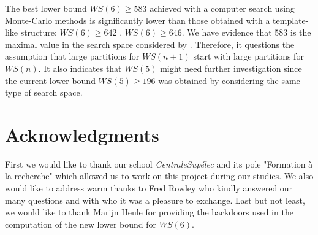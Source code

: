 \documentclass[3p]{elsarticle}
\newtheorem{computational theorem}[definition]{Computational Theorem}
\newcommand{\WS}{\mathit{WS}}
\begin{document}
The best lower bound \(\WS(6) \geqslant 583\) achieved with a computer search using Monte-Carlo methods 
\cite{EliahouBook} is significantly lower than those obtained with a template-like structure: \(\WS(6) \geqslant 642\) \cite{RowleyWS}, 
\(\WS(6) \geqslant 646\). We have evidence that 583 is the maximal value in the search space considered by 
\cite{EliahouBook,Bouzy2015AnAP,Rafilipojaona}. Therefore, it questions the assumption that large partitions for \(\WS(n+1)\) 
start with large partitions for \(\WS(n)\). It also indicates that \(\WS(5)\) might need further investigation since the current lower 
bound \(\WS(5) \geqslant 196\) \cite{ELIAHOU2012175} was obtained by considering the same type of search space.


\section{Acknowledgments}

First we would like to thank our school \textit{CentraleSupélec} and its pole "Formation \`a la recherche" which allowed us to work
on this project during our studies. We also would like to address warm thanks to Fred Rowley who kindly answered our many questions
and with who it was a pleasure to exchange. Last but not least, we would like to thank Marijn Heule for providing the backdoors
used in the computation of the new lower bound for \(\WS(6)\).






\end{document}
